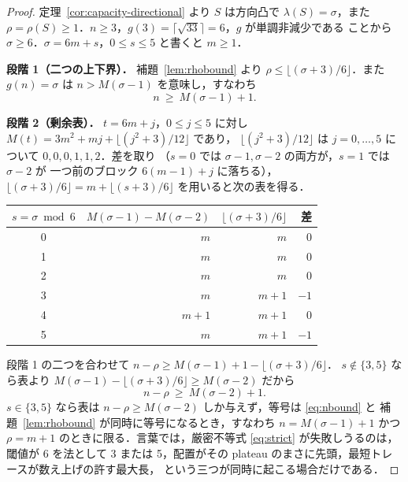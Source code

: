 \documentclass[11pt]{article}
\theoremstyle{plain}
\theoremstyle{definition}
\theoremstyle{remark}
\begin{document}
\begin{proof}
定理~\ref{cor:capacity-directional} より \(S\) は方向凸で \(\lambda(S)=\sigma\)，また
\(\rho=\rho(S)\ge1\)．\(n\ge3\)，\(g(3)=\lceil\sqrt{33}\rceil=6\)，\(g\) が単調非減少である
ことから \(\sigma\ge6\)．\(\sigma=6m+s\)，\(0\le s\le5\) と書くと \(m\ge1\)．

\medskip\noindent\textbf{段階 1（二つの上下界）．}
補題~\ref{lem:rhobound} より \(\rho\le\lfloor(\sigma+3)/6\rfloor\)．また \(g(n)=\sigma\) は
\(n>M(\sigma-1)\) を意味し，すなわち
\begin{equation}\label{eq:nbound}
   n\ \ge\ M(\sigma-1)+1 .
\end{equation}

\medskip\noindent\textbf{段階 2（剰余表）．}
\(t=6m+j\)，\(0\le j\le5\) に対し \(M(t)=3m^{2}+mj+\lfloor(j^{2}+3)/12\rfloor\) であり，
\(\lfloor(j^{2}+3)/12\rfloor\) は \(j=0,\dots,5\) について \(0,0,0,1,1,2\)．差を取り
（\(s=0\) では \(\sigma-1,\sigma-2\) の両方が，\(s=1\) では \(\sigma-2\) が
一つ前のブロック \(6(m-1)+j\) に落ちる），
\(\lfloor(\sigma+3)/6\rfloor=m+\lfloor(s+3)/6\rfloor\) を用いると次の表を得る．

\begin{center}
\begin{tabular}{crrr}
\hline
\(s=\sigma\bmod 6\) & \(M(\sigma-1)-M(\sigma-2)\) & \(\lfloor(\sigma+3)/6\rfloor\) & 差 \\
\hline
0 & \(m\)   & \(m\)   & \(0\) \\
1 & \(m\)   & \(m\)   & \(0\) \\
2 & \(m\)   & \(m\)   & \(0\) \\
3 & \(m\)   & \(m+1\) & \(-1\) \\
4 & \(m+1\) & \(m+1\) & \(0\) \\
5 & \(m\)   & \(m+1\) & \(-1\) \\
\hline
\end{tabular}
\end{center}

段階 1 の二つを合わせて \(n-\rho\ge M(\sigma-1)+1-\lfloor(\sigma+3)/6\rfloor\)．
\(s\notin\{3,5\}\) なら表より \(M(\sigma-1)-\lfloor(\sigma+3)/6\rfloor\ge M(\sigma-2)\) だから
\begin{equation}\label{eq:strict}
   n-\rho\ \ge\ M(\sigma-2)+1 .
\end{equation}
\(s\in\{3,5\}\) なら表は \(n-\rho\ge M(\sigma-2)\) しか与えず，等号は \eqref{eq:nbound} と
補題~\ref{lem:rhobound} が同時に等号になるとき，すなわち \(n=M(\sigma-1)+1\) かつ
\(\rho=m+1\) のときに限る．言葉では，厳密不等式 \eqref{eq:strict} が失敗しうるのは，閾値が
6 を法として 3 または 5，配置がその plateau のまさに先頭，最短トレースが数え上げの許す最大長，
という三つが同時に起こる場合だけである．


\end{proof}
\end{document}
